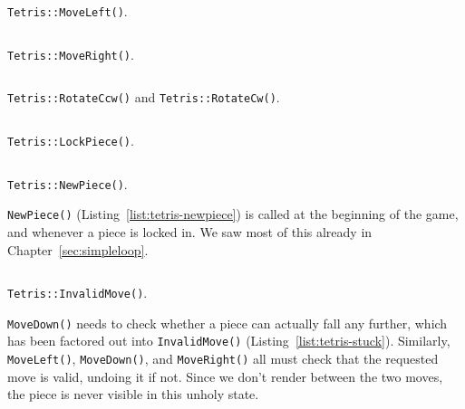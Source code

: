\pagebreak

\begin{listing}[!htb]
\inputminted[]{C}{code-tetris/moveleft.h}
\caption{\texttt{Tetris::MoveLeft()}.}
\label{list:tetris-moveleft}
\end{listing}

\begin{listing}[!htb]
\inputminted[]{C}{code-tetris/moveright.h}
\caption{\texttt{Tetris::MoveRight()}.}
\label{list:tetris-moveright}
\end{listing}

\begin{listing}[!htb]
\inputminted[]{C}{code-tetris/rotate.h}
\caption{\texttt{Tetris::RotateCcw()} and \texttt{Tetris::RotateCw()}.}
\label{list:tetris-rotate}
\end{listing}

\begin{listing}[!htb]
\inputminted[]{C}{code-tetris/lock.h}
\caption{\texttt{Tetris::LockPiece()}.}
\label{list:tetris-lock}
\end{listing}

\begin{listing}[!htb]
\inputminted[]{C}{code-tetris/newpiece.h}
\caption{\texttt{Tetris::NewPiece()}.}
\label{list:tetris-newpiece}
\end{listing}

\texttt{NewPiece()} (Listing~\ref{list:tetris-newpiece}) is called at the
beginning of the game, and whenever a piece is locked in. We saw most of this
already in Chapter~\ref{sec:simpleloop}.

\pagebreak

\begin{listing}[!htb]
\inputminted[]{C}{code-tetris/stuck.h}
\caption{\texttt{Tetris::InvalidMove()}.}
\label{list:tetris-stuck}
\end{listing}

\texttt{MoveDown()} needs to check whether a piece can actually fall any
further, which has been factored out into \texttt{InvalidMove()}
(Listing~\ref{list:tetris-stuck}). Similarly, \texttt{MoveLeft()}, \texttt{MoveDown()},
and \texttt{MoveRight()} all must check that the requested move is valid,
undoing it if not. Since we don't render between the two moves, the piece
is never visible in this unholy state.

